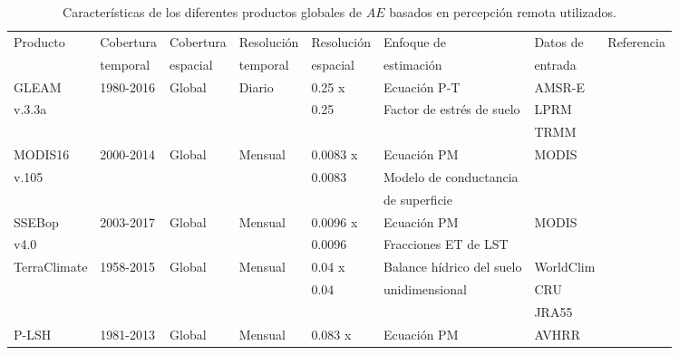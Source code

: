 \begin{sidewaystable}
\caption{\label{tab:ETproducts} Características de los diferentes productos globales de $AE$ basados en percepción remota utilizados.}
\centering
\begin{tabular}{llllllll}
\hline 
Producto     & Cobertura & Cobertura & Resolución & Resolución & Enfoque de                & Datos de   & Referencia      \\
             & temporal  & espacial  & temporal   & espacial   & estimación                & entrada    &                 \\   \hline
GLEAM        & 1980-2016 & Global    & Diario     & 0.25 x     & Ecuación P-T              & AMSR-E     & \citet{Martens2017}     \\
v.3.3a      &           &           &            & 0.25       & Factor de estrés de suelo & LPRM       &                 \\
             &           &           &            &            &                           & TRMM       &                 \\
MODIS16      & 2000-2014 & Global    & Mensual    & 0.0083 x   & Ecuación PM              & MODIS      & \citet{mu2013modis}         \\
v.105         &           &           &            & 0.0083     & Modelo de conductancia    &            &                 \\
             &           &           &            &            & de superficie             &            &                 \\
SSEBop       & 2003-2017 & Global    & Mensual    & 0.0096 x   & Ecuación PM              & MODIS      & \citet{senay2011enhancing}      \\
v4.0         &           &           &            & 0.0096     & Fracciones ET de LST      &            &                 \\
TerraClimate & 1958-2015 & Global    & Mensual    & 0.04 x     & Balance hídrico del suelo & WorldClim  & \citet{abatzoglou2018terraclimate} \\
             &           &           &            & 0.04       & unidimensional            & CRU        &                 \\
             &           &           &            &            &                           & JRA55      &                 \\
P-LSH        & 1981-2013 & Global    & Mensual    & 0.083 x    & Ecuación PM              & AVHRR      & \citet{zhang2015vegetation}      \\

\end{tabular}
\end{sidewaystable}
